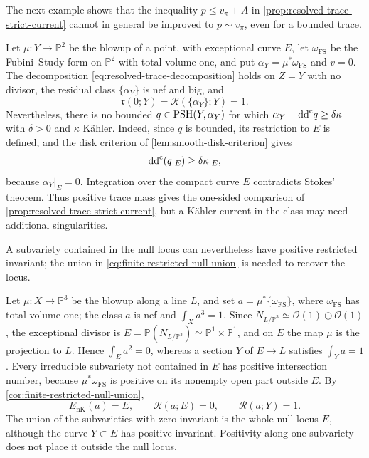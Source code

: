The next example shows that the inequality $p\leq v_\pi+A$ in \cref{prop:resolved-trace-strict-current} cannot in general be improved to $p\sim v_\pi$, even for a bounded trace.

\begin{example}\label{ex:positive-trace-bounded-type-obstruction}
Let $\mu\colon Y\to\mathbb P^2$ be the blowup of a point, with exceptional curve $E$, let $\omega_{\mathrm{FS}}$ be the Fubini--Study form on $\mathbb P^2$ with total volume one, and put $\alpha_Y=\mu^*\omega_{\mathrm{FS}}$ and $v=0$. The decomposition \eqref{eq:resolved-trace-decomposition} holds on $Z=Y$ with no divisor, the residual class $\{\alpha_Y\}$ is nef and big, and
\[
 \mathfrak r(0;Y)=\mathcal R(\{\alpha_Y\};Y)=1.
\]
Nevertheless, there is no bounded $q\in\mathrm{PSH}(Y,\alpha_Y)$ for which $\alpha_Y+\mathrm{dd}^{\mathrm{c}} q\geq\delta\kappa$ with $\delta>0$ and $\kappa$ K\"ahler. Indeed, since $q$ is bounded, its restriction to $E$ is defined, and the disk criterion of \cref{lem:smooth-disk-criterion} gives
\[
 \mathrm{dd}^{\mathrm{c}}(q|_E)\geq\delta\kappa|_E,
\]
because $\alpha_Y|_E=0$. Integration over the compact curve $E$ contradicts Stokes' theorem. Thus positive trace mass gives the one-sided comparison of \cref{prop:resolved-trace-strict-current}, but a K\"ahler current in the class may need additional singularities.
\end{example}

A subvariety contained in the null locus can nevertheless have positive restricted invariant; the union in \eqref{eq:finite-restricted-null-union} is needed to recover the locus.

\begin{example}\label{ex:positive-restriction-inside-null-locus}
Let $\mu\colon X\to\mathbb P^3$ be the blowup along a line $L$, and set $a=\mu^*\{\omega_{\mathrm{FS}}\}$, where $\omega_{\mathrm{FS}}$ has total volume one; the class $a$ is nef and $\int_Xa^3=1$. Since $N_{L/\mathbb P^3}\simeq\mathcal O(1)\oplus\mathcal O(1)$, the exceptional divisor is $E=\mathbb P(N_{L/\mathbb P^3})\simeq\mathbb P^1\times\mathbb P^1$, and on $E$ the map $\mu$ is the projection to $L$. Hence $\int_Ea^2=0$, whereas a section $Y$ of $E\to L$ satisfies $\int_Ya=1$. Every irreducible subvariety not contained in $E$ has positive intersection number, because $\mu^*\omega_{\mathrm{FS}}$ is positive on its nonempty open part outside $E$. By \cref{cor:finite-restricted-null-union},
\[
 E_{\mathrm{nK}}(a)=E,
 \qquad \mathcal R(a;E)=0,
 \qquad \mathcal R(a;Y)=1.
\]
The union of the subvarieties with zero invariant is the whole null locus $E$, although the curve $Y\subset E$ has positive invariant. Positivity along one subvariety does not place it outside the null locus.
\end{example}
